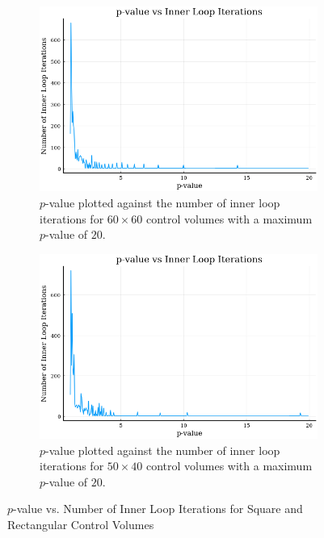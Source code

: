 \documentclass[final]{beamer}
\begin{document}
\begin{frame}
	\begin{figure}
			\begin{subfigure}{0.45\textwidth}
				\includegraphics[width=\linewidth]{60x60-p_vs_Inner-Itter.png}
				\caption[$p$-value vs. $T_{av}$]{$p$-value plotted against the number of inner loop iterations for $60\times 60$ control volumes with a maximum $p$-value of $20$.}
				\label{fig:p-vs-Inner-Itter-60x60}
			\end{subfigure}
			\begin{subfigure}{0.45\textwidth}
				\includegraphics[width=\linewidth]{50x40-p_vs_Inner-Itter.png}
				\caption[$p$-value vs. $T_{av}$]{$p$-value plotted against the number of inner loop iterations for $50\times 40$ control volumes with a maximum $p$-value of $20$.}
				\label{fig:p-vs-Inner-Itter-50x40}
			\end{subfigure}
		\caption[$p$-value vs. Number of Inner Loop Iterations]{$p$-value vs. Number of Inner Loop Iterations for Square and Rectangular Control Volumes}
		\label{fig:p-vs-Inner-Itter}
	\end{figure}
\end{frame}
\end{document}
